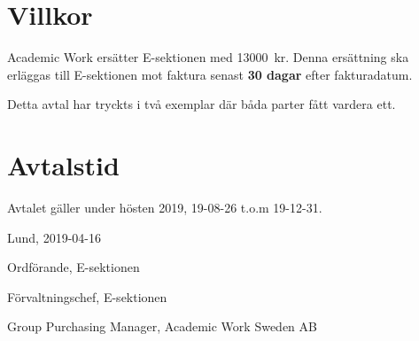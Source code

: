 \documentclass[10pt]{article}
\def\date{2019-04-16} %
\begin{document}
        \section{Villkor}
        Academic Work ersätter E-sektionen med \SI{13000}{kr}. Denna ersättning ska erläggas till E-sektionen mot faktura senast \textbf{30 dagar} efter fakturadatum.
        \newline

        Detta avtal har tryckts i två exemplar där båda parter fått vardera ett.
        
        \section{Avtalstid}
        Avtalet gäller under hösten 2019, 19-08-26 t.o.m 19-12-31.

        \begin{signatures}{3}
            Lund, \date
            \signature{Edvard Carlsson}{Ordförande, E-sektionen}
            \signature{Henrik Ramström}{Förvaltningschef, E-sektionen}
            \signature{Niklas Dennerholt}{Group Purchasing Manager, Academic Work Sweden AB}
        \end{signatures}
    
\end{document}
